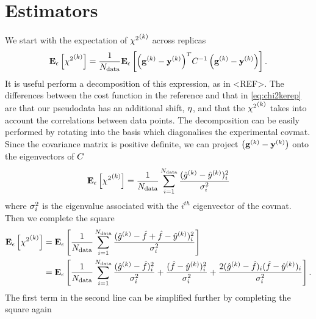\section{Estimators}

We start with the expectation of ${\chi^2}^{(k)}$ across replicas
\begin{equation}
    \label{eq:chi2kerep}
    \mathbf{E}_{\epsilon}\left[ {\chi^2}^{(k)} \right] = \frac{1}{N_{\rm data}} 
    \mathbf{E}_{\epsilon}\left[  {\left( \mathbf{g}^{(k)} - \mathbf{y}^{(k)} \right)}^{T} C^{-1}_{} \left( \mathbf{g}^{(k)} - \mathbf{y}^{(k)} \right) \right].
\end{equation}
It is useful perform a decomposition of this expression, as in <REF>.
The differences between the cost function in the reference and that in
\eqref{eq:chi2kerep} are that our pseudodata has an additional shift, $\eta$,
and that the ${\chi^2}^{(k)}$ takes into account the correlations between data points.
The decomposition can be easily performed by rotating into the basis which
diagonalises the experimental covmat. Since the covariance matrix is positive
definite, we can project $\left( \mathbf{g}^{(k)} - \mathbf{y}^{(k)} \right)$ onto the eigenvectors of $C$
\begin{equation}
    \mathbf{E}_{\epsilon}\left[ {\chi^2}^{(k)} \right] = \frac{1}{N_{\rm data}} \sum_{i=1}^{N_{\rm data}} \frac{(\hat{g}^{(k)} - \hat{y}^{(k)})_i^2}{\sigma^{2}_i}
\end{equation}
where $\sigma^{2}_i$ is the eigenvalue associated with the $i^{th}$ eigenvector of
the covmat. Then we complete the square
\begin{equation}\label{eq:chi2decomp1}
    \begin{split}
        \mathbf{E}_{\epsilon}\left[ {\chi^2}^{(k)} \right] &=
        \mathbf{E}_{\epsilon}\left[ \frac{1}{N_{\rm data}} \sum_{i=1}^{N_{\rm data}}
            \frac{
                (\hat{g}^{(k)} - \hat{f} + \hat{f} - \hat{y}^{(k)})_i^2
            }{\sigma^{2}_i}  \right] \\
        &= \mathbf{E}_{\epsilon}\left[ \frac{1}{N_{\rm data}} \sum_{i=1}^{N_{\rm data}}
            \frac{(\hat{g}^{(k)} - \hat{f})^2_i}{\sigma^{2}_i} +
            \frac{(\hat{f} - \hat{y}^{(k)})_i^2}{\sigma^{2}_i} +
            \frac{2(\hat{g}^{(k)} - \hat{f})_i(\hat{f} - \hat{y}^{(k)})_i}{\sigma^{2}_i} \right].
    \end{split}
\end{equation}
The first term in the second line can be simplified further by completing the
square again
